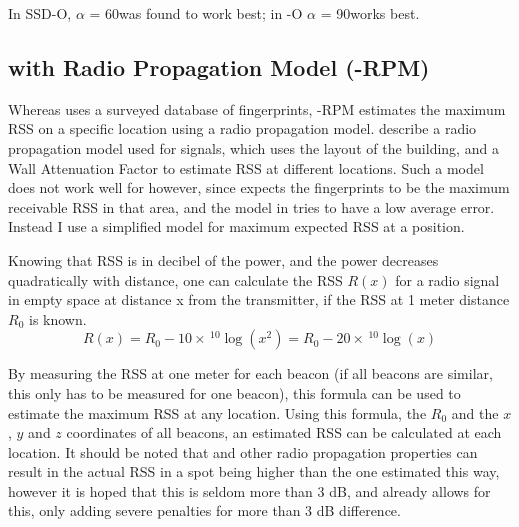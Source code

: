 In SSD-O, $\alpha$ = 60\tdegree was found to work best; in \aBRP-O $\alpha$ = 90\tdegree works best.

\subsection{\BRP with Radio Propagation Model (\aBRP-RPM)}
Whereas \aBRP uses a surveyed database of fingerprints, \aBRP-RPM estimates the maximum RSS on a specific location using a radio propagation model.
\citet{bahl2000radar} describe a radio propagation model used for \wifi signals, which uses the layout of the building, and a Wall Attenuation Factor to estimate RSS at different locations.
Such a model does not work well for \aBRP however, since \aBRP expects the fingerprints to be the maximum receivable RSS in that area, and the model in \citet{bahl2000radar} tries to have a low average error.
Instead I use a simplified model for maximum expected RSS at a position.

Knowing that RSS is in decibel of the power, and the power decreases quadratically with distance, one can calculate the RSS $R(x)$ for a radio signal in empty space at distance x from the transmitter, if the RSS at 1 meter distance $R_0$ is known.
\begin{equation}
    R(x) = R_0 - 10 \times \, ^{10}\log(x^2) = R_0 - 20 \times \, ^{10}\log(x)
\end{equation}

By measuring the RSS at one meter for each beacon (if all beacons are similar, this only has to be measured for one beacon), this formula can be used to estimate the maximum RSS at any location.
Using this formula, the $R_0$ and the $x$, $y$ and $z$ coordinates of all beacons, an estimated RSS can be calculated at each location.
It should be noted that \mpp and other radio propagation properties can result in the actual RSS in a spot being higher than the one estimated this way, however it is hoped that this is seldom more than 3 dB, and  already allows for this, only adding severe penalties for more than 3 dB difference.

